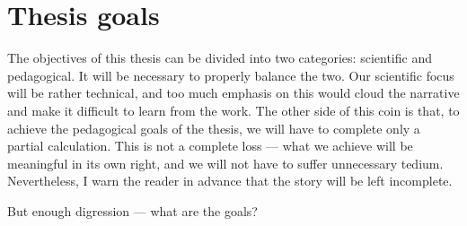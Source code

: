 \documentclass[12pt,twoside,class=../reedthesis, crop=false]{standalone}
\begin{document}
\section{Thesis goals}
	The objectives of this thesis can be divided into two categories: scientific and pedagogical. It will be necessary to properly balance the two. Our scientific focus will be rather technical, and too much emphasis on this would cloud the narrative and make it difficult to learn from the work. The other side of this coin is that, to achieve the pedagogical goals of the thesis, we will have to complete only a partial calculation. This is not a complete loss --- what we achieve will be meaningful in its own right, and we will not have to suffer unnecessary tedium. Nevertheless, I warn the reader in advance that the story will be left incomplete.

	But enough digression --- what are the goals?
\end{document}
